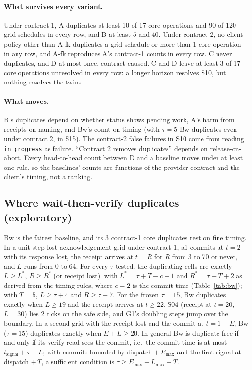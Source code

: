 \documentclass[11pt]{article}
\newcommand{\code}[1]{\texttt{#1}}
\begin{document}
\paragraph{What survives every variant.} Under contract 1, A duplicates at least 10 of 17 core operations and 90 of 120 grid schedules in every row, and B at least 5 and 40. Under contract 2, no client policy other than A-fk duplicates a grid schedule or more than 1 core operation in any row, and A-fk reproduces A's contract-1 counts in every row. C never duplicates, and D at most once, contract-caused. C and D leave at least 3 of 17 core operations unresolved in every row: a longer horizon resolves S10, but nothing resolves the twins.

\paragraph{What moves.} B's duplicates depend on whether status shows pending work, A's harm from receipts on naming, and Bw's count on timing (with $\tau=5$ Bw duplicates even under contract 2, in S15). The contract-2 false failures in S10 come from reading \code{in\_progress} as failure. ``Contract 2 removes duplicates'' depends on release-on-abort. Every head-to-head count between D and a baseline moves under at least one rule, so the baselines' counts are functions of the provider contract and the client's timing, not a ranking.

\subsection{Where wait-then-verify duplicates (exploratory)}\label{sec:bw}

Bw is the fairest baseline, and its 3 contract-1 core duplicates rest on fine timing. In a unit-step lost-acknowledgement grid under contract 1, a1 commits at $t=2$ with its response lost, the receipt arrives at $t=R$ for $R$ from 3 to 70 or never, and $L$ runs from 0 to 64. For every $\tau$ tested, the duplicating cells are exactly $L \geq L^*$, $R \geq R^*$ (or receipt lost), with $L^* = \tau + T - c + 1$ and $R^* = \tau + T + 2$ as derived from the timing rules, where $c=2$ is the commit time (Table~\ref{tab:bw}); with $T=5$, $L \geq \tau+4$ and $R \geq \tau+7$. For the frozen $\tau=15$, Bw duplicates exactly when $L \geq 19$ and the receipt arrives at $t \geq 22$. S04 (receipt at $t=20$, $L=30$) lies 2 ticks on the safe side, and G1's doubling steps jump over the boundary. In a second grid with the receipt lost and the commit at $t=1+E$, Bw ($\tau=15$) duplicates exactly when $E+L \geq 20$. In general Bw is duplicate-free if and only if its verify read sees the commit, i.e.\ the commit time is at most $t_{\text{signal}} + \tau - L$; with commits bounded by dispatch $+\,E_{\max}$ and the first signal at dispatch $+\,T$, a sufficient condition is $\tau \geq E_{\max} + L_{\max} - T$.
\end{document}
